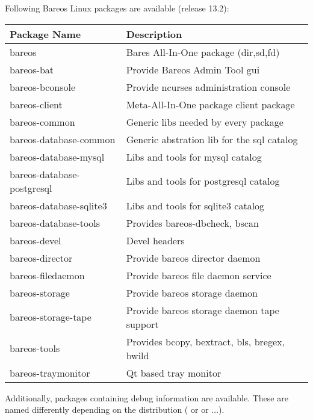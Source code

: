 Following Bareos Linux packages are available (release 13.2):

\begin{center}
\begin{tabular}{ | l | l | }
\hline
\textbf{Package Name} & \textbf{Description} \\ \hline
bareos & Bares All-In-One package (dir,sd,fd) \\
bareos-bat & Provide Bareos Admin Tool gui \\
bareos-bconsole & Provide ncurses administration console \\
bareos-client & Meta-All-In-One package client package \\
bareos-common & Generic libs needed by every package \\
bareos-database-common & Generic abstration lib for the sql catalog \\
bareos-database-mysql & Libs and tools for mysql catalog \\
bareos-database-postgresql & Libs and tools for postgresql catalog \\
bareos-database-sqlite3 & Libs and tools for sqlite3 catalog \\
bareos-database-tools & Provides bareos-dbcheck, bscan \\
bareos-devel & Devel headers \\
bareos-director & Provide bareos director daemon \\
bareos-filedaemon & Provide bareos file daemon service \\
bareos-storage & Provide bareos storage daemon \\
bareos-storage-tape & Provide bareos storage daemon tape support \\
bareos-tools & Provides bcopy, bextract, bls, bregex, bwild \\
bareos-traymonitor & Qt based tray monitor \\
\hline
\end{tabular}
\end{center}

Additionally, packages containing debug information are available.
These are named differently depending on the distribution ( or  or  $\ldots$).


